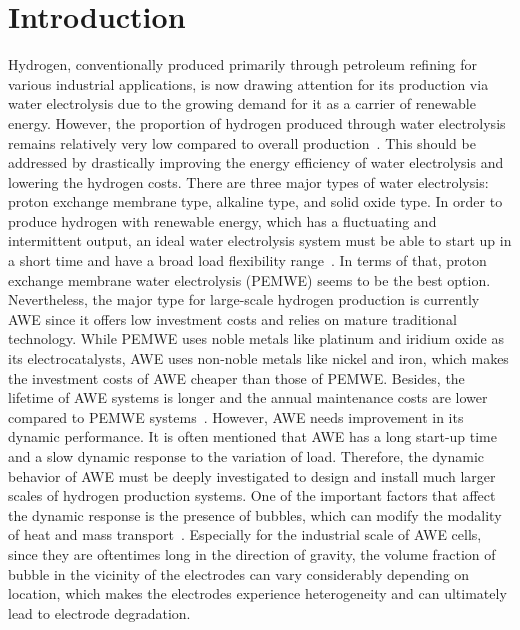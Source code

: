 \documentclass[3p, twocolumn, 10pt]{elsarticle}
\begin{document}

\section{Introduction}
\label{sec:intro}
Hydrogen, conventionally produced primarily through petroleum refining for various industrial applications, is now drawing attention for its production via water electrolysis due to the growing demand for it as a carrier of renewable energy.
However, the proportion of hydrogen produced through water electrolysis remains relatively very low compared to overall production~\cite{IEA-H2Future}.
This should be addressed by drastically improving the energy efficiency of water electrolysis and lowering the hydrogen costs. 
There are three major types of water electrolysis: proton exchange membrane type, alkaline type, and solid oxide type. 
In order to produce hydrogen with renewable energy, which has a fluctuating and intermittent output, an ideal water electrolysis system must be able to start up in a short time and have a broad load flexibility range~\cite{braunsAlkalineWaterElectrolysis2020}.
In terms of that, proton exchange membrane water electrolysis (PEMWE) seems to be the best option. 
Nevertheless, the major type for large-scale hydrogen production is currently AWE since it offers low investment costs and relies on mature traditional technology. 
While PEMWE uses noble metals like platinum and iridium oxide as its electrocatalysts, AWE uses non-noble metals like nickel and iron, which makes the investment costs of AWE cheaper than those of PEMWE. 
Besides, the lifetime of AWE systems is longer and the annual maintenance costs are lower compared to PEMWE systems~\cite{schmidtFutureCostPerformance2017, buttlerCurrentStatusWater2018}.
However, AWE needs improvement in its dynamic performance. 
It is often mentioned that AWE has a long start-up time and a slow dynamic response to the variation of load. 
Therefore, the dynamic behavior of AWE must be deeply investigated to design and install much larger scales of hydrogen production systems. 
One of the important factors that affect the dynamic response is the presence of bubbles, which can modify the modality of heat and mass transport~\cite{anguloInfluenceBubblesEnergy2020, parkSolutalMarangoniEffect2023}.
Especially for the industrial scale of AWE cells, since they are oftentimes long in the direction of gravity, the volume fraction of bubble in the vicinity of the electrodes can vary considerably depending on location, which makes the electrodes experience heterogeneity and can ultimately lead to electrode degradation. 
\end{document}
